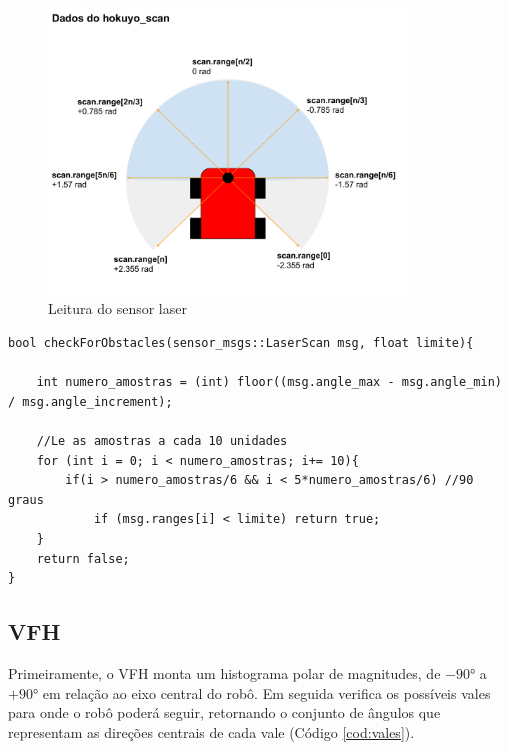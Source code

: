 \begin{figure}[H]
    \centering
    \includegraphics[width=0.85\textwidth]{img/SensorAngulos.pdf}
    \caption{Leitura do sensor laser}
    \label{fig:laser_scan}
\end{figure}

\begin{lstlisting}[frame=single, label=cod:checkObstacles, style=customc,
caption={Algoritmo de Verificação de Obstáculos}]
bool checkForObstacles(sensor_msgs::LaserScan msg, float limite){
    
    int numero_amostras = (int) floor((msg.angle_max - msg.angle_min) / msg.angle_increment);
    
    //Le as amostras a cada 10 unidades
    for (int i = 0; i < numero_amostras; i+= 10){
        if(i > numero_amostras/6 && i < 5*numero_amostras/6) //90 graus
            if (msg.ranges[i] < limite) return true;
    }
    return false;
}
\end{lstlisting}


\subsection{VFH}

Primeiramente, o VFH monta um histograma polar de magnitudes, de $-90°$ a $+90°$ em relação ao eixo central do
robô. Em seguida verifica os possíveis vales para onde o robô poderá
seguir, retornando o conjunto de ângulos que representam as direções
centrais de cada vale (Código \ref{cod:vales}).

